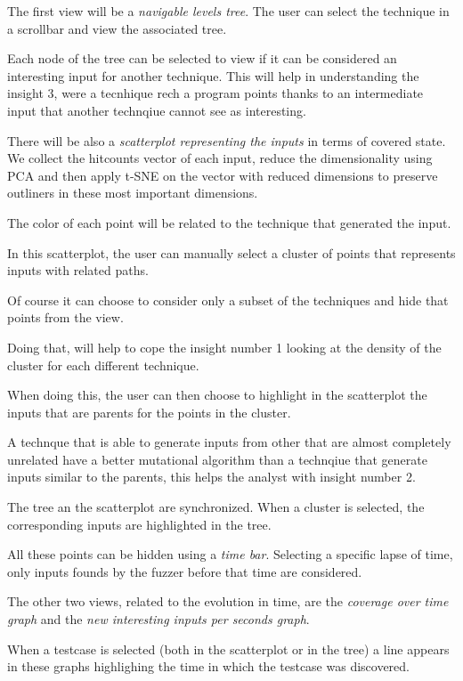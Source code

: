 \documentclass[conference,compsoc]{IEEEtran}
\begin{document}
The first view will be a {\em navigable levels tree}. The user can select the technique in a scrollbar and view the associated tree.

Each node of the tree can be selected to view if it can be considered an interesting input for another technique. This will help in understanding the insight 3, were a tecnhique rech a program points thanks to an intermediate input that another technqiue cannot see as interesting.

There will be also a {\em scatterplot representing the inputs} in terms of covered state.
We collect the hitcounts vector of each input, reduce the dimensionality using PCA and then apply t-SNE on the vector with reduced dimensions to preserve outliners in these most important dimensions.

The color of each point will be related to the technique that generated the input.

In this scatterplot, the user can manually select a cluster of points that represents inputs with related paths.

Of course it can choose to consider only a subset of the techniques and hide that points from the view.

Doing that, will help to cope the insight number 1 looking at the density of the cluster for each different technique.

When doing this, the user can then choose to highlight in the scatterplot the inputs that are parents for the points in the cluster.

A technque that is able to generate inputs from other that are almost completely unrelated have a better mutational algorithm than a technqiue that generate inputs similar to the parents, this helps the analyst with insight number 2.

The tree an the scatterplot are synchronized. When a cluster is selected, the corresponding inputs are highlighted in the tree.

All these points can be hidden using a {\em time bar}. Selecting a specific lapse of time, only inputs founds by the fuzzer before that time are considered.

The other two views, related to the evolution in time, are the {\em coverage over time graph} and the {\em new interesting inputs per seconds graph}.

When a testcase is selected (both in the scatterplot or in the tree) a line appears in these graphs highlighing the time in which the testcase was discovered.
\end{document}

